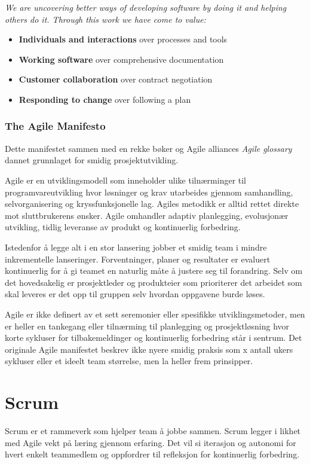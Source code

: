 \textit{We are uncovering better ways of developing software by doing it and helping others do it. Through this work we have come to value:}
\begin{itemize}
    \item \textbf{Individuals and interactions} over processes and tools
    \item \textbf{Working software} over comprehensive documentation
    \item \textbf{Customer collaboration} over contract negotiation
    \item \textbf{Responding to change} over following a plan
\end{itemize}

\subsubsection{\textbf{The Agile Manifesto}}
Dette manifestet sammen med en rekke bøker og Agile alliances \textit{Agile glossary}
dannet grunnlaget for smidig prosjektutvikling. 

Agile er en utviklingsmodell som inneholder ulike tilnærminger til programvareutvikling hvor løsninger og krav utarbeides gjennom samhandling, selvorganisering og kryssfunksjonelle lag. Agiles metodikk er alltid rettet direkte mot sluttbrukerens ønsker. Agile omhandler adaptiv planlegging, evolusjonær utvikling, tidlig leveranse av produkt og kontinuerlig forbedring.
 
Istedenfor å legge alt i en stor lansering jobber et smidig team i mindre inkrementelle lanseringer. Forventninger, planer og resultater er evaluert kontinuerlig for å gi teamet en naturlig måte å justere seg til forandring. Selv om det hovedsakelig er prosjektleder og produkteier som prioriterer det arbeidet som skal leveres er det opp til gruppen selv hvordan oppgavene burde løses.
 
Agile er ikke definert av et sett seremonier eller spesifikke utviklingsmetoder, men er heller en tankegang eller tilnærming til planlegging og prosjektløsning hvor korte sykluser for tilbakemeldinger og kontinuerlig forbedring står i sentrum. Det originale Agile manifestet beskrev ikke nyere smidig praksis som x antall ukers sykluser eller et ideelt team størrelse, men la heller frem prinsipper.
 

\section{\textbf{Scrum}}
Scrum er et rammeverk som hjelper team å jobbe sammen. Scrum legger i likhet med Agile vekt på læring gjennom erfaring. Det vil si iterasjon og autonomi for hvert enkelt teammedlem og oppfordrer til refleksjon for kontinuerlig forbedring. 

